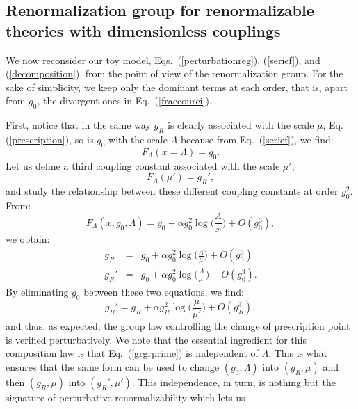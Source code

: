 \documentclass[floatfix,twocolumn,preprintnumbers,amsmath,amssymb,prb]{revtex4}
\begin{document}
\subsection{Renormalization group for renormalizable theories
with dimensionless couplings}

We now reconsider our toy model, Eqs.~(\ref{perturbationreg}),
(\ref{serief}), and (\ref{decomposition}), from the point of view
of the renormalization group. For the sake of simplicity, we keep
only the dominant terms at each order, that is, apart from $g_0$,
the divergent ones in Eq.~(\ref{fraccourci}). 

First, notice that in the same way $g_R$ is clearly associated with the
scale
$\mu$, Eq.(\ref{prescription}), so is $g_0$ with the scale $\Lambda$ because from 
Eq.~(\ref{serief}), we find\cite{foot10}:
\begin{equation}
F_\Lambda(x=\Lambda)=g_0.
\label{eqfoot10}
\end{equation}
Let us define a third coupling constant associated with the scale
$\mu'$,
\begin{equation}
F_\Lambda(\mu')=g_R',
\label{prescriptionprime}
\end{equation}
and study the relationship between these different coupling
constants at order $g_0^2$. From:
\begin{equation}
F_\Lambda(x,g_0,\Lambda)=g_0 + \alpha g_0^2
\log\big(\frac{\Lambda}{x}\big) + O(g_0^3),
\label{fordre2}
\end{equation}
we obtain:
\begin{eqnarray}
g_R&=&g_0 +\alpha g_0^2 \log\big(\frac{\Lambda}{\mu}\big) +
O(g_0^3)\label{grp.a}\\
g_R'&=&g_0 +\alpha g_0^2 \log\big(\frac{\Lambda}{\mu'}\big) +
O(g_0^3).
\label{grp}
\end{eqnarray}
By eliminating $g_0$ between these two equations, we find:
\begin{equation}
g_R'=g_R +\alpha g_R^2 \log\big(\frac{\mu}{\mu'}\big) + O(g_R^3),
\label{grgrprime}
\end{equation}
and thus, as expected, the group law controlling the change of
prescription point is verified perturbatively. We note that
the essential ingredient for this composition law is that
Eq.~(\ref{grgrprime}) is independent of $\Lambda$. This is what
ensures that the same form can be used to change
$(g_0,\Lambda)$ into $(g_R,\mu)$ and then $(g_R,\mu)$ into
$(g_R',\mu')$. This independence, in turn, is nothing but the
signature of perturbative renormalizability which lets us
\end{document}
